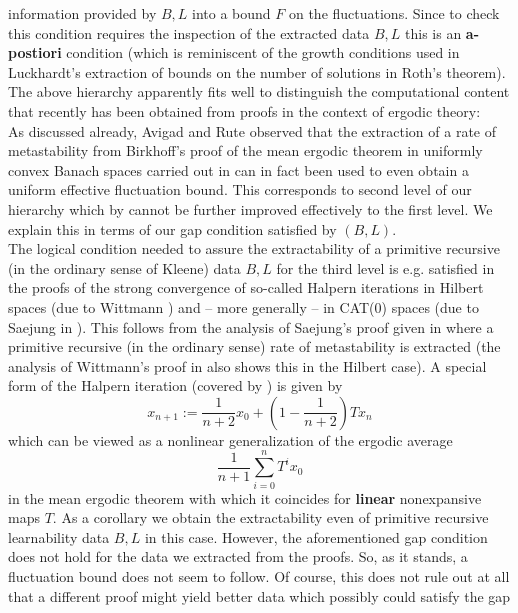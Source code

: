 \documentclass[1p]{elsarticle}
\theoremstyle{plain}
\theoremstyle{definition}
\theoremstyle{remark}
\theoremstyle{definition}
\begin{document}
information provided by $B,L$ into a bound $F$ on the fluctuations. 
Since to check this condition requires the inspection of the extracted 
data $B,L$ this is an {\bf a-postiori} condition (which is reminiscent of 
the growth conditions used in Luckhardt's \cite{Luckhardt(89)} extraction 
of bounds on the number of solutions in Roth's theorem).
\\[2mm] 
The above hierarchy apparently fits well to distinguish the 
computational content that recently has been obtained from proofs 
in the context of ergodic theory: \\[1mm] 
As discussed already, Avigad and Rute \cite{Avigad/Rute} observed 
that the extraction of a rate of metastability from Birkhoff's 
proof of the mean ergodic theorem in uniformly convex Banach 
spaces carried out in \cite{Kohlenbach/Leustean4} can in fact been 
used to even obtain a uniform effective fluctuation bound.  
This corresponds to second level of our hierarchy 
which by \cite{Avigad/Gerhardy/Towsner} 
cannot be further improved effectively to the first level. We explain 
this in terms of our gap condition satisfied by $(B,L).$
\\[1mm] The logical condition needed to assure the extractability of a 
primitive recursive 
(in the ordinary sense of Kleene) data $B,L$ for the third 
level is e.g. satisfied in 
the proofs of the strong convergence of so-called Halpern iterations 
in Hilbert spaces (due to Wittmann \cite{Wittmann(92)}) and -- more 
generally --  in CAT(0) spaces (due to Saejung in 
\cite{Saejung}). This follows from the 
analysis of Saejung's proof 
given in \cite{Kohlenbach/Leustean6} where a primitive 
recursive (in the ordinary sense) rate of metastability is extracted
(the analysis of Wittmann's proof in \cite{Kohlenbach(Browder)} also 
shows this in the Hilbert case).  
A special form of the Halpern iteration (covered by 
\cite{Wittmann(92),Saejung}) is given by  
\[ x_{n+1} :=\frac{1}{n+2}x_0+\left(1-\frac{1}{n+2}\right) Tx_n \]
which can be viewed as a nonlinear generalization of 
the ergodic average 
\[ \frac{1}{n+1}\sum^n_{i=0}T^ix_0 \] 
in the mean ergodic theorem with which it coincides 
for {\bf linear} nonexpansive  maps $T.$ 
As a corollary we obtain the extractability even 
of primitive recursive learnability data $B,L$ in this case. 
However, the aforementioned gap condition does not hold for the data 
we extracted from the proofs. So, as it stands, a fluctuation bound does 
not seem to follow. Of course, this does not rule out at all that a different 
proof might yield better data which possibly could satisfy the gap 
\end{document}

